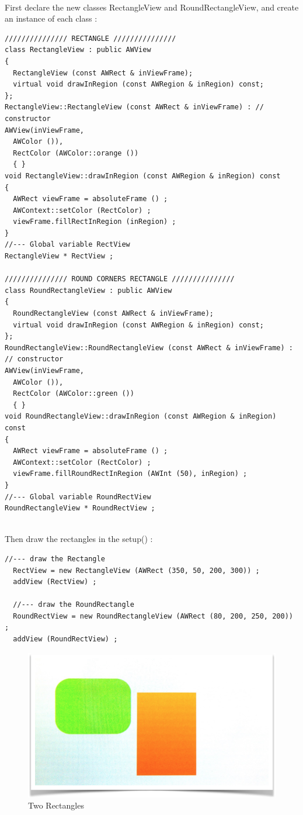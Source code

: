 \documentclass[a4paper,11pt]{extarticle}
\begin{document}
~\\ First declare the new classes  RectangleView and RoundRectangleView, and create an instance of each class :

\begin{lstlisting}[language=Arduinonl]
/////////////// RECTANGLE ///////////////
class RectangleView : public AWView
{
  RectangleView (const AWRect & inViewFrame);
  virtual void drawInRegion (const AWRegion & inRegion) const;
};
RectangleView::RectangleView (const AWRect & inViewFrame) : // constructor
AWView(inViewFrame, 
  AWColor ()),             
  RectColor (AWColor::orange ()) 
  { }
void RectangleView::drawInRegion (const AWRegion & inRegion) const
{
  AWRect viewFrame = absoluteFrame () ;
  AWContext::setColor (RectColor) ;
  viewFrame.fillRectInRegion (inRegion) ;
}
//--- Global variable RectView
RectangleView * RectView ;

/////////////// ROUND CORNERS RECTANGLE ///////////////
class RoundRectangleView : public AWView
{
  RoundRectangleView (const AWRect & inViewFrame);
  virtual void drawInRegion (const AWRegion & inRegion) const;
};
RoundRectangleView::RoundRectangleView (const AWRect & inViewFrame) : // constructor
AWView(inViewFrame, 
  AWColor ()),             
  RectColor (AWColor::green ()) 
  { }
void RoundRectangleView::drawInRegion (const AWRegion & inRegion) const
{
  AWRect viewFrame = absoluteFrame () ;
  AWContext::setColor (RectColor) ;
  viewFrame.fillRoundRectInRegion (AWInt (50), inRegion) ;
}
//--- Global variable RoundRectView
RoundRectangleView * RoundRectView ;
\end{lstlisting}

~\\ Then draw the rectangles in the setup() :

\begin{lstlisting}[language=Arduinonl]
  //--- draw the Rectangle
  RectView = new RectangleView (AWRect (350, 50, 200, 300)) ;
  addView (RectView) ;   
  
  //--- draw the RoundRectangle
  RoundRectView = new RoundRectangleView (AWRect (80, 200, 250, 200)) ;
  addView (RoundRectView) ;   
\end{lstlisting}

\begin{figure}[htbp]
   \centering
   \includegraphics[scale=0.55]{AWFig7.png} 
   \caption{Two Rectangles}
   \label{fig:7}
\end{figure}
\end{document}
